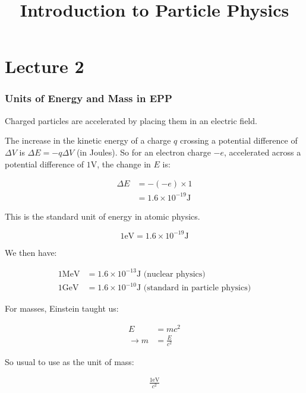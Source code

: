 \documentclass[10pt,a4paper]{article}
\title{Introduction to Particle Physics}
\begin{document}
\part*{Lecture 2}

\section*{Units of Energy and Mass in EPP}

Charged particles are accelerated by placing them in an electric field.

The increase in the kinetic energy of a charge $q$ crossing a potential difference of $\Delta V$ is $\Delta E = -q \Delta V$ (in Joules). So for an electron charge $-e$, accelerated across a potential difference of $1 \textrm{V}$, the change in $E$ is:

\begin{align*}
\Delta E &= - (-e) \times 1 \\
&= 1.6 \times 10^{-19} \mathrm{J}
\end{align*}

This is the standard unit of energy in atomic physics.

\begin{equation}
1 \mathrm{eV} = 1.6 \times 10^{-19} \mathrm{J}
\end{equation}

We then have:

\begin{align*}
1 \mathrm{MeV} &= 1.6 \times 10^{-13} \mathrm{J} \text{ (nuclear physics)} \\
1 \mathrm{GeV} &= 1.6 \times 10^{-10} \mathrm{J} \text{ (standard in particle physics)}
\end{align*}

For masses, Einstein taught us:

\begin{align*}
E &= mc^2 \\
\rightarrow m &= \frac{E}{c^2}
\end{align*}

So usual to use as the unit of mass:

\begin{align*}
\frac{1 \mathrm{eV}}{c^2}
\end{align*}
\end{document}
